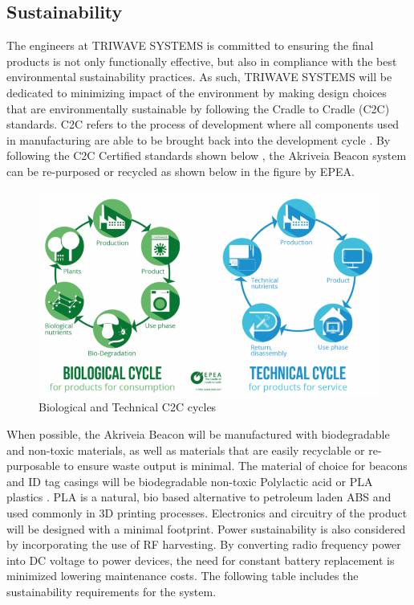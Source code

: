\break
\subsection{Sustainability}
\medskip
The engineers at TRIWAVE SYSTEMS is committed to ensuring the final products is not only functionally effective, but also in compliance with the best environmental sustainability practices. As such, TRIWAVE SYSTEMS will be dedicated to minimizing impact of the environment by making design choices that are environmentally sustainable by following the Cradle to Cradle (\Gls{C2C}) standards. C2C refers to the process of development where all components used in manufacturing are able to be brought back into the development cycle \cite{R23}. By following the C2C Certified standards shown below \cite{R25}, the Akriveia Beacon system can be re-purposed or recycled as shown below in the figure by EPEA.

\begin{figure}[H]
\centering
    \includegraphics[scale=0.85]{./images/BioTechCycle.png}
    \caption{Biological and Technical C2C cycles}
\end{figure}

When possible, the Akriveia Beacon will be manufactured with biodegradable and non-toxic materials, as well as materials that are easily recyclable or re-purposable to ensure waste output is minimal. The material of choice for beacons and ID tag casings will be biodegradable non-toxic Polylactic acid or PLA plastics \cite{R25}. PLA is a natural, bio based alternative to petroleum laden ABS and used commonly in 3D printing processes. Electronics and circuitry of the product will be designed with a minimal footprint. Power sustainability is also considered by incorporating the use of RF harvesting. By converting radio frequency power into DC voltage to power devices, the need for constant battery replacement is minimized lowering maintenance costs. The following table includes the sustainability requirements for the system.

